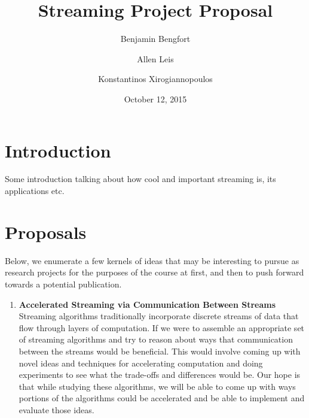 \documentclass[11pt,letterpaper]{article}
\begin{document}
\title{Streaming Project Proposal}
\author[1]{Benjamin Bengfort}
\author[2]{Allen Leis}
\author[1]{Konstantinos Xirogiannopoulos}

\date{October 12, 2015}

\maketitle
\section{Introduction}
Some introduction talking about how cool and important streaming is, its applications etc.

\section{Proposals}
Below, we enumerate a few kernels of ideas that may be interesting to pursue as research projects for the purposes of the course at first, and then to push forward towards a potential publication.

\begin{enumerate}
  \item \textbf{Accelerated Streaming via Communication Between Streams}
   Streaming algorithms traditionally incorporate discrete streams of data that flow through layers of computation. If we were to assemble an appropriate set of streaming algorithms and try to reason about ways that communication between the streams would be beneficial. This would involve coming up with novel ideas and techniques for accelerating computation and doing experiments to see what the trade-offs and differences would be. Our hope is that while studying these algorithms, we will be able to come up with ways portions of the algorithms could be accelerated and be able to implement and evaluate those ideas.
\end{enumerate}



\end{document}

